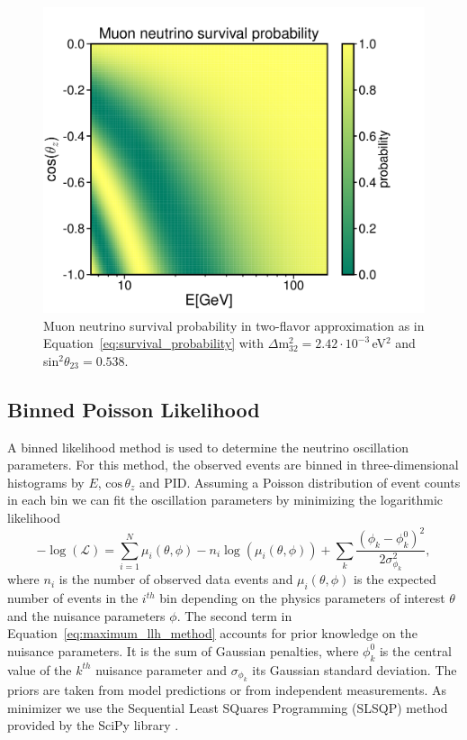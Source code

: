 \begin{figure}[h]
    \centering
    \includegraphics[trim = 00 00 00 00, clip, width=0.75\linewidth]{figures/oscillaogram_muon.pdf}
    \caption[Muon neutrino survival probability in two-flavor approximation]{Muon neutrino survival probability in two-flavor approximation as in Equation~\ref{eq:survival_probability} with $\Delta\mathrm{m}^2_{32}=2.42\cdot10^{-3}$\,eV$^2$ and sin$^2\theta_{23}=0.538$.}
    \label{fig:muon_surv_prob}
\end{figure}

\subsection{Binned Poisson Likelihood} \label{sec:likelihood_estimation}

A binned likelihood method is used to determine the neutrino oscillation parameters.
For this method, the observed events are binned in three-dimensional histograms by $E$, $\mathrm{cos}\,\theta_z$ and PID.
Assuming a Poisson distribution of event counts in each bin we can fit the oscillation parameters by minimizing the logarithmic likelihood
\begin{equation}
    -\log(\mathcal{L}) = \sum^N_{i=1}\mu_i(\theta, \phi)-n_i\log(\mu_i(\theta, \phi)) + \sum_k \frac{(\phi_k-\phi^0_k)^2}{2\sigma_{\phi_k}^2},
    \label{eq:maximum_llh_method}
\end{equation}
where $n_i$ is the number of observed data events and $\mu_i(\theta, \phi)$ is the expected number of events in the $i^{th}$ bin depending on the physics parameters of interest $\theta$ and the nuisance parameters $\phi$.
The second term in Equation~\ref{eq:maximum_llh_method} accounts for prior knowledge on the nuisance parameters.
It is the sum of Gaussian penalties, where $\phi^0_k$ is the central value of the $k^{th}$ nuisance parameter and $\sigma_{\phi_k}$ its Gaussian standard deviation.
The priors are taken from model predictions or from independent measurements.
As minimizer we use the Sequential Least SQuares Programming (SLSQP) method provided by the SciPy library \cite{2019arXiv190710121V}.

